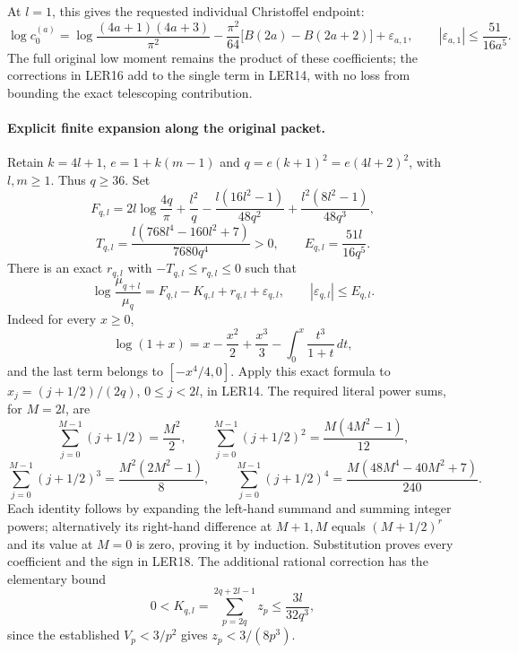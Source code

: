 \documentclass[11pt,a4paper]{article}
\begin{document}
At $l=1$, this gives the requested individual Christoffel endpoint:
\[
 \boxed{\displaystyle
 \log c_0^{(a)}
 =\log\frac{(4a+1)(4a+3)}{\pi^2}
 -\frac{\pi^2}{64}\bigl[B(2a)-B(2a+2)\bigr]
 +\varepsilon_{a,1},\qquad
 |\varepsilon_{a,1}|\le\frac{51}{16a^5}.}
 \tag{LER16}
\]
The full original low moment remains the product of these coefficients;
the corrections in LER16 add to the single term in LER14, with no
loss from bounding the exact telescoping contribution.

\paragraph{Explicit finite expansion along the original packet.}
Retain $k=4l+1$, $e=1+k(m-1)$ and
$q=e(k+1)^2=e(4l+2)^2$, with $l,m\ge1$. Thus $q\ge36$.
Set
\[
 F_{q,l}=2l\log\frac{4q}{\pi}
 +\frac{l^2}{q}-\frac{l(16l^2-1)}{48q^2}
 +\frac{l^2(8l^2-1)}{48q^3},
\]
\[
 T_{q,l}=\frac{l(768l^4-160l^2+7)}{7680q^4}>0,
 \qquad E_{q,l}=\frac{51l}{16q^5}.
 \tag{LER17}
\]
There is an exact $r_{q,l}$ with $-T_{q,l}\le r_{q,l}\le0$ such that
\[
 \boxed{\displaystyle
 \log\frac{\mu_{q+l}}{\mu_q}
 =F_{q,l}-K_{q,l}+r_{q,l}+\varepsilon_{q,l},\qquad
 |\varepsilon_{q,l}|\le E_{q,l}.}
 \tag{LER18}
\]
Indeed for every $x\ge0$,
\[
 \log(1+x)=x-\frac{x^2}{2}+\frac{x^3}{3}
              -\int_0^x\frac{t^3}{1+t}\,dt,
\]
and the last term belongs to $[-x^4/4,0]$.
Apply this exact formula to $x_j=(j+1/2)/(2q)$, $0\le j<2l$,
in LER14. The required literal power sums, for $M=2l$, are
\[
 \sum_{j=0}^{M-1}(j+1/2)=\frac{M^2}{2},\qquad
 \sum_{j=0}^{M-1}(j+1/2)^2=\frac{M(4M^2-1)}{12},
\]
\[
 \sum_{j=0}^{M-1}(j+1/2)^3=\frac{M^2(2M^2-1)}8,\qquad
 \sum_{j=0}^{M-1}(j+1/2)^4
 =\frac{M(48M^4-40M^2+7)}{240}.
 \tag{LER19}
\]
Each identity follows by expanding the left-hand summand and summing
integer powers; alternatively its right-hand difference at $M+1,M$
equals $(M+1/2)^r$ and its value at $M=0$ is zero, proving it by
induction. Substitution proves every coefficient and the sign in LER18.
The additional rational correction has the elementary bound
\[
 0<K_{q,l}=\sum_{p=2q}^{2q+2l-1}z_p
 \le\frac{3l}{32q^3},
 \tag{LER20}
\]
since the established $V_p<3/p^2$ gives $z_p<3/(8p^3)$.
\end{document}
